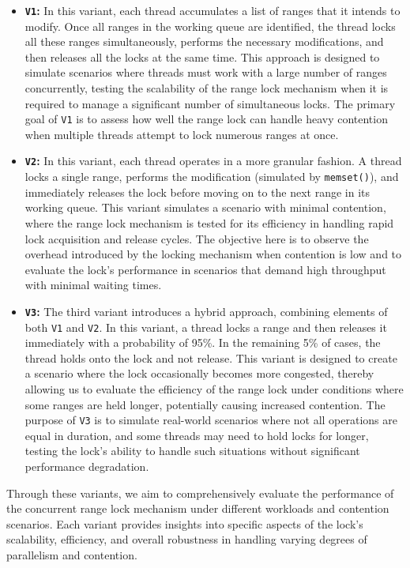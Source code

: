 \begin{itemize} 
    \item \textbf{\texttt{V1}:} In this variant, each thread accumulates a list of ranges that it intends to modify. Once all ranges in the working queue are identified, the thread locks all these ranges simultaneously, performs the necessary modifications, and then releases all the locks at the same time. This approach is designed to simulate scenarios where threads must work with a large number of ranges concurrently, testing the scalability of the range lock mechanism when it is required to manage a significant number of simultaneous locks. The primary goal of \texttt{V1} is to assess how well the range lock can handle heavy contention when multiple threads attempt to lock numerous ranges at once.
    
    \item \textbf{\texttt{V2}:} In this variant, each thread operates in a more granular fashion. A thread locks a single range, performs the modification (simulated by \texttt{memset()}), and immediately releases the lock before moving on to the next range in its working queue. This variant simulates a scenario with minimal contention, where the range lock mechanism is tested for its efficiency in handling rapid lock acquisition and release cycles. The objective here is to observe the overhead introduced by the locking mechanism when contention is low and to evaluate the lock's performance in scenarios that demand high throughput with minimal waiting times.
    
    \item \textbf{\texttt{V3}:} The third variant introduces a hybrid approach, combining elements of both \texttt{V1} and \texttt{V2}. In this variant, a thread locks a range and then releases it immediately with a probability of 95\%. In the remaining 5\% of cases, the thread holds onto the lock and not release. This variant is designed to create a scenario where the lock occasionally becomes more congested, thereby allowing us to evaluate the efficiency of the range lock under conditions where some ranges are held longer, potentially causing increased contention. The purpose of \texttt{V3} is to simulate real-world scenarios where not all operations are equal in duration, and some threads may need to hold locks for longer, testing the lock's ability to handle such situations without significant performance degradation.
\end{itemize}

Through these variants, we aim to comprehensively evaluate the performance of the concurrent range lock mechanism under different workloads and contention scenarios. Each variant provides insights into specific aspects of the lock's scalability, efficiency, and overall robustness in handling varying degrees of parallelism and contention.

